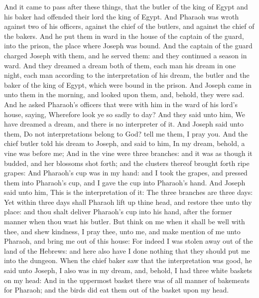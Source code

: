 \begin{biblechapter} %
 And it came to pass after these things, that the butler of the king of Egypt and his baker had offended their lord the king of Egypt.
\verse And Pharaoh was wroth against two of his officers, against the chief of the butlers, and against the chief of the bakers.
\verse And he put them in ward in the house of the captain of the guard, into the prison, the place where Joseph was bound.
\verse And the captain of the guard charged Joseph with them, and he served them: and they continued a season in ward.
\verse And they dreamed a dream both of them, each man his dream in one night, each man according to the interpretation of his dream, the butler and the baker of the king of Egypt, which were bound in the prison.
\verse And Joseph came in unto them in the morning, and looked upon them, and, behold, they were sad.
\verse And he asked Pharaoh's officers that were with him in the ward of his lord's house, saying, Wherefore look ye so sadly to day?
\verse And they said unto him, We have dreamed a dream, and there is no interpreter of it. And Joseph said unto them, Do not interpretations belong to God? tell me them, I pray you.
\verse And the chief butler told his dream to Joseph, and said to him, In my dream, behold, a vine was before me;
\verse And in the vine were three branches: and it was as though it budded, and her blossoms shot forth; and the clusters thereof brought forth ripe grapes:
\verse And Pharaoh's cup was in my hand: and I took the grapes, and pressed them into Pharaoh's cup, and I gave the cup into Pharaoh's hand.
\verse And Joseph said unto him, This is the interpretation of it: The three branches are three days:
\verse Yet within three days shall Pharaoh lift up thine head, and restore thee unto thy place: and thou shalt deliver Pharaoh's cup into his hand, after the former manner when thou wast his butler.
\verse But think on me when it shall be well with thee, and shew kindness, I pray thee, unto me, and make mention of me unto Pharaoh, and bring me out of this house:
\verse For indeed I was stolen away out of the land of the Hebrews: and here also have I done nothing that they should put me into the dungeon.
\verse When the chief baker saw that the interpretation was good, he said unto Joseph, I also was in my dream, and, behold, I had three white baskets on my head:
\verse And in the uppermost basket there was of all manner of bakemeats for Pharaoh; and the birds did eat them out of the basket upon my head.

\end{biblechapter}
